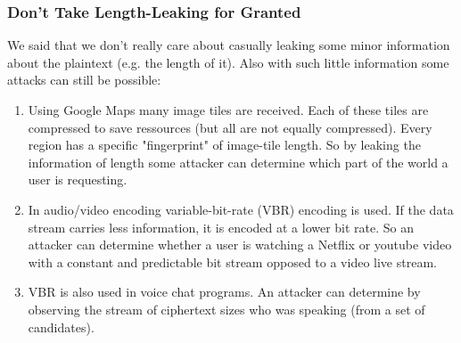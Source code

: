 \documentclass{article}
\begin{document}
\begin{adjustwidth}{2em}{2em}
\begin{adjustwidth}{2em}{2em}
				\subsubsection{Don't Take Length-Leaking for Granted}
				\begin{adjustwidth}{2em}{1em}
					We said that we don't really care about casually leaking some minor information about the plaintext (e.g. the length of it). Also with such little information some attacks can still be possible:
					\begin{enumerate}
						\item Using Google Maps many image tiles are received. Each of these tiles are compressed to save ressources (but all are not equally compressed). Every region has a specific "fingerprint" of image-tile length. So by leaking the information of length some attacker can determine which part of the world a user is requesting.
						\item In audio/video encoding variable-bit-rate (VBR) encoding is used. If the data stream carries less information, it is encoded at a lower bit rate. So an attacker can determine whether a user is watching a Netflix or youtube video with a constant and predictable bit stream opposed to a video live stream.
						\item VBR is also used in voice chat programs. An attacker can determine by observing the stream of ciphertext sizes who was speaking (from a set of candidates).
					\end{enumerate}
				\end{adjustwidth}
			\end{adjustwidth}
		\end{adjustwidth}
		\newpage
\end{document}
